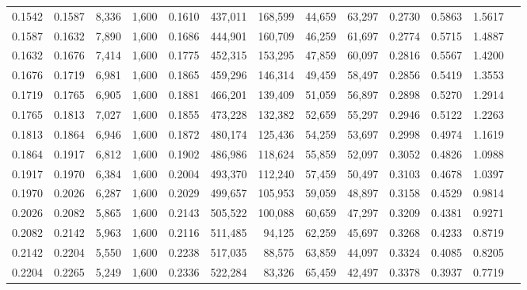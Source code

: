 \begin{tabular}{rrrrrrrrrrrrr}
0.1542 & 0.1587 &  8,336 & 1,600 &                                     0.1610 & 437,011 & 168,599 &  44,659 &  63,297 & 0.2730 & 0.5863 & 1.5617 \\
0.1587 & 0.1632 &  7,890 & 1,600 &                                     0.1686 & 444,901 & 160,709 &  46,259 &  61,697 & 0.2774 & 0.5715 & 1.4887 \\
0.1632 & 0.1676 &  7,414 & 1,600 &                                     0.1775 & 452,315 & 153,295 &  47,859 &  60,097 & 0.2816 & 0.5567 & 1.4200 \\
0.1676 & 0.1719 &  6,981 & 1,600 &                                     0.1865 & 459,296 & 146,314 &  49,459 &  58,497 & 0.2856 & 0.5419 & 1.3553 \\
0.1719 & 0.1765 &  6,905 & 1,600 &                                     0.1881 & 466,201 & 139,409 &  51,059 &  56,897 & 0.2898 & 0.5270 & 1.2914 \\
0.1765 & 0.1813 &  7,027 & 1,600 &                                     0.1855 & 473,228 & 132,382 &  52,659 &  55,297 & 0.2946 & 0.5122 & 1.2263 \\
0.1813 & 0.1864 &  6,946 & 1,600 &                                     0.1872 & 480,174 & 125,436 &  54,259 &  53,697 & 0.2998 & 0.4974 & 1.1619 \\
0.1864 & 0.1917 &  6,812 & 1,600 &                                     0.1902 & 486,986 & 118,624 &  55,859 &  52,097 & 0.3052 & 0.4826 & 1.0988 \\
0.1917 & 0.1970 &  6,384 & 1,600 &                                     0.2004 & 493,370 & 112,240 &  57,459 &  50,497 & 0.3103 & 0.4678 & 1.0397 \\
0.1970 & 0.2026 &  6,287 & 1,600 &                                     0.2029 & 499,657 & 105,953 &  59,059 &  48,897 & 0.3158 & 0.4529 & 0.9814 \\
0.2026 & 0.2082 &  5,865 & 1,600 &                                     0.2143 & 505,522 & 100,088 &  60,659 &  47,297 & 0.3209 & 0.4381 & 0.9271 \\
0.2082 & 0.2142 &  5,963 & 1,600 &                                     0.2116 & 511,485 &  94,125 &  62,259 &  45,697 & 0.3268 & 0.4233 & 0.8719 \\
0.2142 & 0.2204 &  5,550 & 1,600 &                                     0.2238 & 517,035 &  88,575 &  63,859 &  44,097 & 0.3324 & 0.4085 & 0.8205 \\
0.2204 & 0.2265 &  5,249 & 1,600 &                                     0.2336 & 522,284 &  83,326 &  65,459 &  42,497 & 0.3378 & 0.3937 & 0.7719 \\

\end{tabular}
